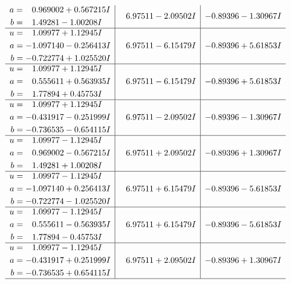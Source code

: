 \documentclass[1p]{elsarticle_modified}
\theoremstyle{definition}
\begin{document}
$$\begin{array}{c|c|c}
\begin{aligned}
a &= \phantom{-}0.969002 + 0.567215 I \\
b &= \phantom{-}1.49281 - 1.00208 I\end{aligned}
 & \phantom{-}6.97511 - 2.09502 I & -0.89396 - 1.30967 I \\ \hline\begin{aligned}
u &= \phantom{-}1.09977 + 1.12945 I \\
a &= -1.097140 - 0.256413 I \\
b &= -0.722774 + 1.025520 I\end{aligned}
 & \phantom{-}6.97511 - 6.15479 I & -0.89396 + 5.61853 I \\ \hline\begin{aligned}
u &= \phantom{-}1.09977 + 1.12945 I \\
a &= \phantom{-}0.555611 + 0.563935 I \\
b &= \phantom{-}1.77894 + 0.45753 I\end{aligned}
 & \phantom{-}6.97511 - 6.15479 I & -0.89396 + 5.61853 I \\ \hline\begin{aligned}
u &= \phantom{-}1.09977 + 1.12945 I \\
a &= -0.431917 - 0.251999 I \\
b &= -0.736535 - 0.654115 I\end{aligned}
 & \phantom{-}6.97511 - 2.09502 I & -0.89396 - 1.30967 I \\ \hline\begin{aligned}
u &= \phantom{-}1.09977 - 1.12945 I \\
a &= \phantom{-}0.969002 - 0.567215 I \\
b &= \phantom{-}1.49281 + 1.00208 I\end{aligned}
 & \phantom{-}6.97511 + 2.09502 I & -0.89396 + 1.30967 I \\ \hline\begin{aligned}
u &= \phantom{-}1.09977 - 1.12945 I \\
a &= -1.097140 + 0.256413 I \\
b &= -0.722774 - 1.025520 I\end{aligned}
 & \phantom{-}6.97511 + 6.15479 I & -0.89396 - 5.61853 I \\ \hline\begin{aligned}
u &= \phantom{-}1.09977 - 1.12945 I \\
a &= \phantom{-}0.555611 - 0.563935 I \\
b &= \phantom{-}1.77894 - 0.45753 I\end{aligned}
 & \phantom{-}6.97511 + 6.15479 I & -0.89396 - 5.61853 I \\ \hline\begin{aligned}
u &= \phantom{-}1.09977 - 1.12945 I \\
a &= -0.431917 + 0.251999 I \\
b &= -0.736535 + 0.654115 I\end{aligned}
 & \phantom{-}6.97511 + 2.09502 I & -0.89396 + 1.30967 I\\
 \hline 
 \end{array}$$\newpage\newpage\renewcommand{\arraystretch}{1}
\end{document}
